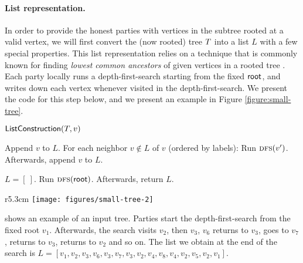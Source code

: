 \paragraph{List representation.} In order to provide the honest parties with vertices in the subtree rooted at a valid vertex, we will first convert the (now rooted) tree $T$ into a list $L$ with a few special properties. This list representation relies on a technique that is commonly known for finding \emph{lowest common ancestors} of given vertices in a rooted tree \cite{LCATrick}. Each party locally runs a depth-first-search starting from the fixed $\textsf{root}$, and writes down each vertex whenever visited in the depth-first-search. 
We present the code for this step below, and we present an example in Figure \ref{figure:small-tree}.
\begin{dianabox}{$\textsf{ListConstruction}(T, v)$}
	\begin{algorithmic}[1]
            \State Append $v$ to $L$.
            \State For each neighbor $v \notin L$ of $v$ (ordered by labels):
            \State \hspace{0.5cm} Run $\textsc{dfs}(v')$. Afterwards, append $v$ to $L$.
    \end{algorithmic}
    \vspace{0.5cm}
    
	\begin{algorithmic}[1]
            \State $L = [\ ]$. Run $\textsc{dfs}(\textsf{root})$. Afterwards, return $L$.
    \end{algorithmic}
\end{dianabox}

\begin{wrapfigure}{r}{5.3cm}
\centering
\texttt{[image: figures/small-tree-2]}
\caption{An input tree.}\label{figure:small-tree}
\end{wrapfigure} 



 shows an example of an input tree. Parties start the depth-first-search from the fixed root $v_1$. Afterwards, the search visits $v_2$, then $v_3$, $v_6$ returns to $v_3$, goes to $v_7$, returns to $v_3$, returns to $v_2$ and so on. The list we obtain at the end of the search is $L = [v_1, v_2, v_3, v_6, v_3, v_7, v_3, v_2, v_4, v_8, v_4, v_2, v_5, v_2, v_1]$.


